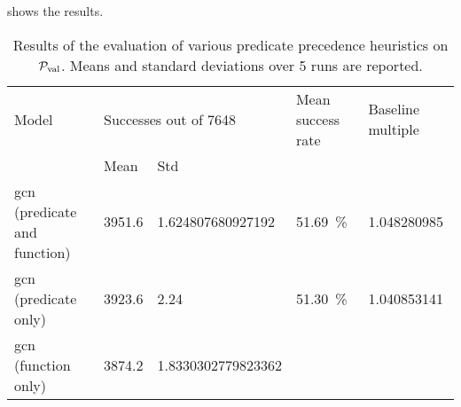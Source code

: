  shows the results.

\begin{table*}[h]
\caption{
Results of the evaluation of various predicate precedence heuristics on $\operatorname{\mathcal{P}_{\mathrm{val}}}$.
Means and standard deviations over 5 runs are reported.
}
\label{tab:results}
\centering
\begin{tabular}{l|ll|ll}

Model & \multicolumn{2}{l}{Successes out of \num{7648}} & Mean success rate & Baseline multiple \\
& Mean & Std & & \\

\hline


\acrshort{gcn} (predicate and function) &

\num{3951.6} &
\num[round-mode=places,round-precision=2]{1.624807680927192} &
\SI{51.69}{\percent} &
\num[round-mode=places,round-precision=3]{1.048280985} \\


\acrshort{gcn} (predicate only) &

\num{3923.6} &

\num{2.24} &

\SI{51.30}{\percent} &

\num[round-mode=places,round-precision=3]{1.040853141} \\


\acrshort{gcn} (function only) &

\num{3874.2} &

\num[round-mode=places,round-precision=2]{1.8330302779823362} &


\end{tabular}
\end{table*}
